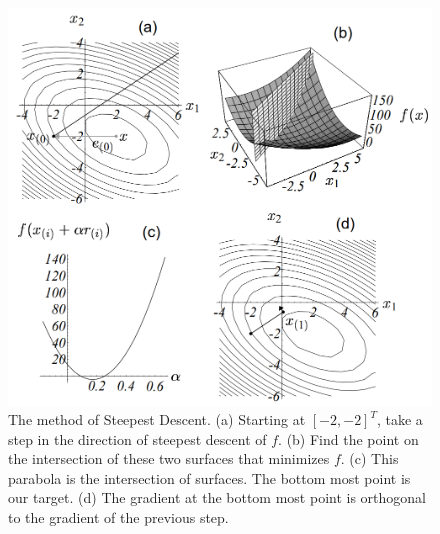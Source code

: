 \documentclass{article}
\begin{document}
\begin{figure}[H]
   \centering
   \includegraphics[scale=0.4]{figure/steepest_descent.png}
   \caption{The method of Steepest Descent. (a) Starting at $[-2,-2]^T$, take a step in the direction of steepest descent of $f$. (b) Find the point on the intersection of these two surfaces that minimizes $f$. (c) This parabola is the intersection of surfaces. The bottom most point is our target. (d) The gradient at the bottom most point is orthogonal to the gradient of the previous step.}
   \label{fig:steepest}
\end{figure}
\end{document}
